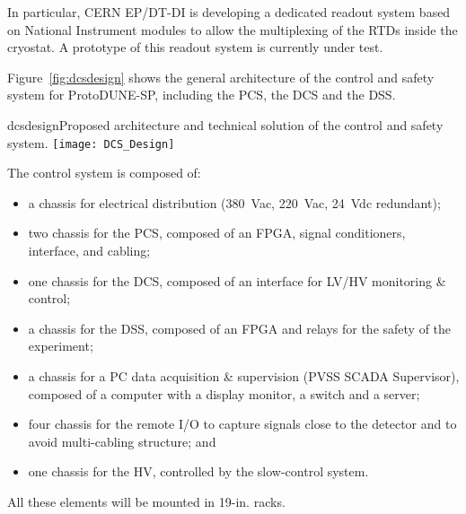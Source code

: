 In particular, CERN EP/DT-DI is developing a dedicated readout system based on National Instrument modules to allow the 
multiplexing of the RTDs inside the cryostat.  A prototype of this readout system is currently under test.
 
Figure~\ref{fig:dcsdesign} shows the general architecture of the control and safety system for ProtoDUNE-SP, including the PCS, the DCS and the DSS.

\begin{cdrfigure}{dcsdesign}{Proposed architecture and technical solution of the control and safety system.}
\texttt{[image: DCS\_Design]}
\end{cdrfigure}

The control system is composed of:
\begin{itemize}
\item a chassis for electrical distribution (380~Vac, 220~Vac, 24~Vdc redundant);
\item two chassis for the PCS, composed of an FPGA, signal conditioners, interface, and cabling;
\item one chassis for the DCS,  composed of an interface for LV/HV monitoring \& control; 
\item a chassis for the DSS, composed of an FPGA and relays for the safety of the experiment; 
\item a chassis for a PC data acquisition \& supervision (PVSS SCADA Supervisor), composed of a computer with a display monitor, a switch and a server; 
\item four chassis for the remote I/O to capture signals close to the detector and to avoid multi-cabling structure; and
\item one chassis for the HV, controlled by the slow-control system. 
\end{itemize}
All these elements will be mounted in 19-in. racks.


